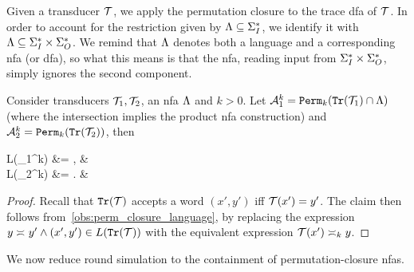 Given a transducer $\cT$, we apply the permutation closure to the trace \gls{dfa} of $\cT$. In order to account for the restriction given by $\fL\subseteq \sI^*$, we identify it with $\fL \subseteq \sI^*\times \sO^*$. We remind that $\fL$ denotes both a language and a corresponding \gls{nfa} (or \gls{dfa}), so what this means is that the \gls{nfa}, reading input from $\sI^*\times \sO^*$, simply ignores the second component.
\begin{lemma}
	\label{lem:permutation_closure_construction}
	Consider transducers $\cT_1,\cT_2$, an \gls{nfa} $\fL$ and $k>0$. Let $\cA_1^k=\perm_k(\tr(\cT_1)\cap\fL)$ (where the intersection implies the product \gls{nfa} construction) and $\cA_2^k=\perm_k(\tr(\cT_2))$, then 
	\small
	\begin{flalign*}
	    L(\cA_1^k) &= , & \\
	    L(\cA_2^k) &= . &
	\end{flalign*}
\end{lemma}
\begin{proof}
	Recall that $\tr(\cT)$ accepts a word $(x',y')$ iff $\cT(x')=y'$. The claim then follows from~\cref{obs:perm_closure_language}, by replacing the expression $y\req y' \wedge (x',y')\in L(\tr(\cT))$ with the equivalent expression $\cT(x')\req[k] y$.
\end{proof}

We now reduce round simulation to the containment of permutation-closure \glspl{nfa}.

